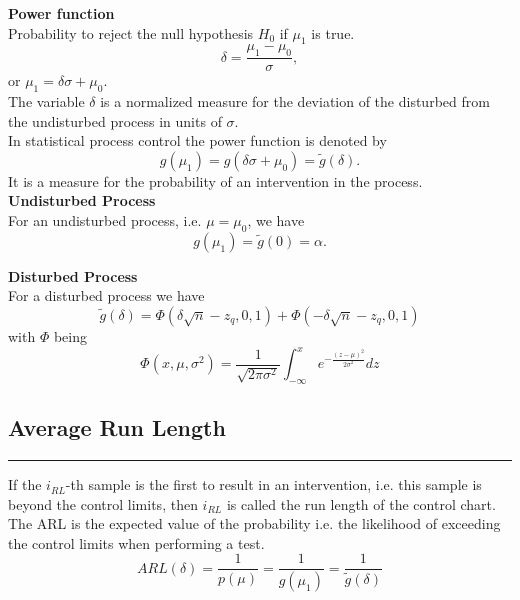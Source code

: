 \textbf{Power function}\\
Probability to reject the null hypothesis $H_0$ if $\mu_1$ is true.\\
\begin{equation}
  \delta = \frac{\mu_1 - \mu_0}{\sigma},
\end{equation}
or $\mu_1 = \delta\sigma + \mu_0$.\\
The variable $\delta$ is a normalized measure for the deviation of the disturbed from the undisturbed process in units of $\sigma$.\\
In statistical process control the power function is denoted by
\begin{equation}
  g(\mu_1) = g(\delta\sigma + \mu_0) = \tilde{g} (\delta).
\end{equation}
It is a measure for the probability of an intervention in the process.\\

 \textbf{Undisturbed Process}\\
 For an undisturbed process, i.e. $\mu = \mu_0$, we have
 \begin{equation}
   g(\mu_1) = \tilde{g} (0) = \alpha.
   \label{eq:3.3.a}
 \end{equation}

\textbf{Disturbed Process}\\
For a disturbed process we have
\begin{equation}
  \tilde{g}(\delta) = \Phi(\delta\sqrt{n} - z_q, 0, 1) + \Phi(-\delta\sqrt{n} - z_q, 0, 1)
  \label{eq:3.3.d}
\end{equation}
with $\Phi$ being
\begin{equation}
  \Phi(x, \mu, \sigma^2) = \frac{1}{\sqrt{2\pi\sigma^2}}\int^x_{-\infty}e^{-\frac{{(z-\mu)}^2}{2\sigma^2}}dz
\end{equation}


\subsection{Average Run Length}
\noindent\rule[\linienAbstand]{\linewidth}{\linienDicke}
If the $i_{RL}$-th sample is the first to result in an intervention, i.e. this sample is beyond the control limits, then $i_{RL}$ is called the run length of the control chart.\\
The ARL is the expected value of the probability i.e. the likelihood of exceeding the control limits when performing a test.
\begin{equation}
  ARL(\delta) = \frac{1}{p(\mu)} = \frac{1}{g(\mu_1)} = \frac{1}{\tilde{g}(\delta)}
\end{equation}

